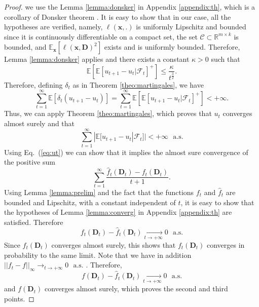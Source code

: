 \documentclass[twoside,11pt]{article}
\def\x{{\mathbf x}}
\def\l{{\ell}}
\def\hatf{{ \hat f}}
\def\as{\text{~~a.s.}}
\def\D{{\mathbf D}}
\def\E{{\mathbb E}}
\def\C{{\mathcal C}}
\def\hatf{{ \hat f}}
\def\Real{{\mathbb R}}
\begin{document}
\begin{proof}
we use the Lemma \ref{lemma:donsker} in Appendix \ref{appendix:th},
which is a corollary of Donsker theorem \citep[see][chap. 19.2]{vaart}.
It is easy to show that in our case, all the hypotheses are verified,
namely, $\l(\x,.)$ is uniformly Lipschitz and bounded since it is continuously differentiable on a compact set,
the set $\C \subset \Real^{m \times k}$ is bounded, and
$\E_\x[\l(\x,\D)^2]$ exists and is uniformly bounded.
Therefore, Lemma \ref{lemma:donsker} applies and there exists a constant $\kappa>0$
such that
\begin{displaymath}
   \E[\E[u_{t+1}-u_t | {\mathcal F}_t]^+] \leq \frac{\kappa}{t^{\frac{3}{2}}}.
\end{displaymath}
Therefore, defining $\delta_t$ as in Theorem \ref{theo:martingales},
we have 
\begin{displaymath}
   \sum_{t=1}^\infty \E[\delta_t(u_{t+1}-u_t)] = \sum_{t=1}^\infty
   \E[\E[u_{t+1}-u_t | {\mathcal F}_t]^+] < +\infty.
\end{displaymath}
Thus, we can apply Theorem \ref{theo:martingales}, which proves that
$u_t$ converges almost surely and that 
\begin{displaymath}
   \sum_{t=1}^\infty |\E[u_{t+1}-u_t | {\mathcal F}_t]| < +\infty \as
\end{displaymath}
Using Eq.~(\ref{eq:ut}) we can show that it implies the
almost sure convergence of the positive sum
\begin{displaymath}
   \sum_{t=1}^\infty \frac{\hatf_t(\D_t)-f_t(\D_t)}{t+1}.
\end{displaymath}
Using Lemma \ref{lemma:prelim} and the fact that the functions $f_t$ and
$\hatf_t$ are
bounded and Lipschitz, with a constant independent of
$t$, it is easy to show that the hypotheses of Lemma
\ref{lemma:converg} in Appendix \ref{appendix:th} are satisfied. Therefore
\begin{displaymath}
   f_t(\D_t)-\hatf_t(\D_t) \underset{t \to + \infty}{\longrightarrow} 0 \as
\end{displaymath}
Since $\hatf_t(\D_t)$ converges almost surely, this shows that
$f_t(\D_t)$ converges in probability to the same limit. Note that
we have in addition $||f_t-f||_\infty \to_{t\to+\infty} 0 \as$
\citep[see][Theorem 19.4 (Glivenko-Cantelli)]{vaart}.
Therefore, 
\begin{displaymath}
   f(\D_t)-\hatf_t(\D_t) \underset{t \to + \infty}{\longrightarrow} 0 \as
\end{displaymath}
and $f(\D_t)$ converges almost surely, which proves the second and third points.
\end{proof}
\end{document}
